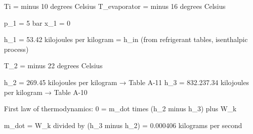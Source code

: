 Ti = minus 10 degrees Celsius  
T_evaporator = minus 16 degrees Celsius  

p_1 = 5 bar  
x_1 = 0  

h_1 = 53.42 kilojoules per kilogram = h_in (from refrigerant tables, isenthalpic process)  

T_2 = minus 22 degrees Celsius  

h_2 = 269.45 kilojoules per kilogram → Table A-11  
h_3 = 832.237.34 kilojoules per kilogram → Table A-10  

First law of thermodynamics:  
0 = m_dot times (h_2 minus h_3) plus W_k  

m_dot = W_k divided by (h_3 minus h_2) = 0.000406 kilograms per second